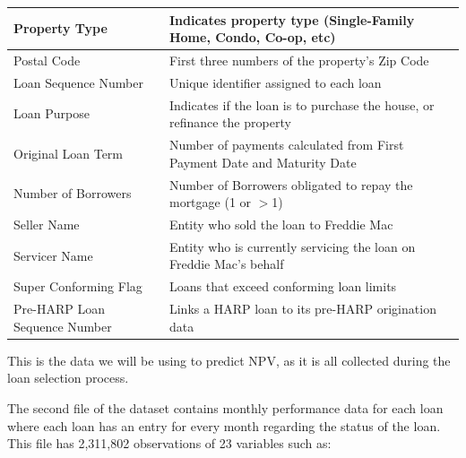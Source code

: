 \documentclass[12 pt]{uncw_thesis}
\theoremstyle{plain}
\theoremstyle{remark}
\theoremstyle{definition}
\begin{document}
\begin{center}
\begin{longtable}{ |M{5.5cm}|M{8.75cm}| }
		\hline
		Property Type & Indicates property type (Single-Family Home, Condo, Co-op, etc) \\
		\hline
		Postal Code & First three numbers of the property's Zip Code\\
		\hline
		Loan Sequence Number & Unique identifier assigned to each loan \\
		\hline
		Loan Purpose & Indicates if the loan is to purchase the house, or refinance the property\\
		\hline
		Original Loan Term & Number of payments calculated from First Payment Date and Maturity Date \\
		\hline
		Number of Borrowers & Number of Borrowers obligated to repay the mortgage (1 or $>$1)\\
		\hline
		Seller Name & Entity who sold the loan to Freddie Mac\\
		\hline
		Servicer Name & Entity who is currently servicing the loan on Freddie Mac's behalf\\
		\hline
		Super Conforming Flag & Loans that exceed conforming loan limits\\
		\hline
		Pre-HARP Loan Sequence Number & Links a HARP loan to its pre-HARP origination data\\
		\hline
	\end{longtable}
\end{center}
\begin{flushleft}
This is the data we will be using to predict NPV, as it is all collected during the loan selection process.
\end{flushleft}
The second file of the dataset contains monthly performance data for each loan where each loan has an entry for every month regarding the status of the loan. This file has 2,311,802 observations of 23 variables such as:
\end{document}
